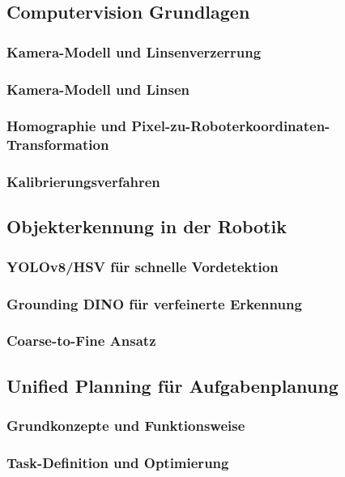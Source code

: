 \documentclass[12pt]{article}
\begin{document}
\subsection{Computervision Grundlagen}
    \subsubsection{Kamera-Modell und Linsenverzerrung}
    \subsubsection{Kamera-Modell und Linsen}
    \subsubsection{Homographie und Pixel-zu-Roboterkoordinaten-Transformation}
    \subsubsection{Kalibrierungsverfahren}

\subsection{Objekterkennung in der Robotik}
    \subsubsection{YOLOv8/HSV für schnelle Vordetektion}
    \subsubsection{Grounding DINO für verfeinerte Erkennung}
    \subsubsection{Coarse-to-Fine Ansatz}

\subsection{Unified Planning für Aufgabenplanung}
    \subsubsection{Grundkonzepte und Funktionsweise}
    \subsubsection{Task-Definition und Optimierung}
\end{document}
